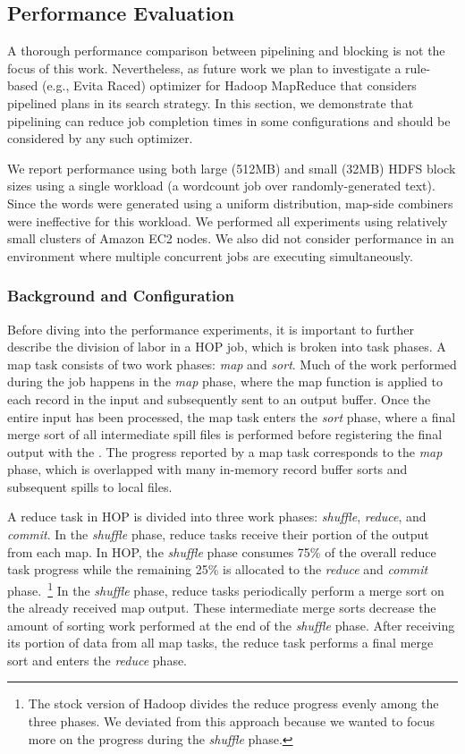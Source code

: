 \subsection{Performance Evaluation}
\label{ch:hop:sec:perf}

A thorough performance comparison between pipelining and blocking is not the
focus of this work.  Nevertheless, as future work we plan to investigate a
rule-based (e.g., Evita Raced) optimizer for Hadoop MapReduce that considers
pipelined plans in its search strategy.  In this section, we demonstrate that
pipelining can reduce job completion times in some configurations and should be
considered by any such optimizer.

We report performance using both large (512MB) and small (32MB) HDFS block
sizes using a single workload (a wordcount job over randomly-generated text).
Since the words were generated using a uniform distribution, map-side combiners
were ineffective for this workload.  We performed all experiments using
relatively small clusters of Amazon EC2 nodes.  We also did not consider
performance in an environment where multiple concurrent jobs are executing
simultaneously.

\subsubsection{Background and Configuration}

Before diving into the performance experiments, it is important to further
describe the division of labor in a HOP job, which is broken into task phases.
A map task consists of two work phases: {\em map} and {\em sort}.  Much of the
work performed during the job happens in the {\em map} phase, where the map
function is applied to each record in the input and subsequently sent to an
output buffer.  Once the entire input has been processed, the map task enters
the {\em sort} phase, where a final merge sort of all intermediate spill files
is performed before registering the final output with the \TT.  The progress
reported by a map task corresponds to the {\em map} phase, which is overlapped
with many in-memory record buffer sorts and subsequent spills to local files.

A reduce task in HOP is divided into three work phases: {\em shuffle}, {\em
reduce}, and {\em commit}.  In the {\em shuffle} phase, reduce tasks receive
their portion of the output from each map.  In HOP, the {\em shuffle} phase
consumes 75\% of the overall reduce task progress while the remaining 25\% is
allocated to the {\em reduce} and {\em commit} phase.~\footnote{The stock
version of Hadoop divides the reduce progress evenly among the three phases.
We deviated from this approach because we wanted to focus more on the progress
during the {\em shuffle} phase.} In the {\em shuffle} phase, reduce tasks
periodically perform a merge sort on the already received map output.  These
intermediate merge sorts decrease the amount of sorting work performed at the
end of the {\em shuffle} phase.  After receiving its portion of data from all
map tasks, the reduce task performs a final merge sort and enters the {\em
reduce} phase.

